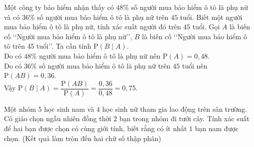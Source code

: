 \begin{ex}%
	Một công ty bảo hiểm nhận thấy có $48 \%$ số người mua bảo hiểm ô tô là phụ nữ và có $36 \%$ số người mua bảo hiểm ô tô là phụ nữ trên $45$ tuổi. Biết một người mua bảo hiểm ô tô là phụ nữ, tính xác suất người đó trên $45$ tuổi.
	\loigiai
	{
		Gọi $A$ là biến cố \lq\lq Người mua bảo hiểm ô tô là phụ nữ\rq\rq, $B$ là biến cố \lq\lq Người mua bảo hiểm ô tô trên 45 tuổi\rq\rq. Ta cần tính $\mathrm{P}(B \mid A)$.\\
		Do có $48 \%$ người mua bảo hiểm ô tô là phụ nữ nên $\mathrm{P}(A)=0{,}48$.\\
		Do có $36 \%$ số người mua bảo hiểm ô tô là phụ nữ trên $45$ tuổi nên $\mathrm{P}(A B)=0{,}36$.\\
		Vậy $\mathrm{P}(B \mid A)=\dfrac{\mathrm{P}(A B)}{\mathrm{P}(A)}=\dfrac{0{,}36}{0{,}48}=0{,}75$.  
	}
\end{ex}

\begin{ex}%
	Một nhóm $5$ học sinh nam và $4$ học sinh nữ tham gia lao động trên sân trường. Cô giáo chọn ngẫu nhiên đồng thời $2$ bạn trong nhóm đi tưới cây. Tính xác suất để hai bạn được chọn có cùng giới tính, biết rằng có ít nhất $1$ bạn nam được chọn.	(Kết quả làm tròn đến hai chữ số thập phân)
\end{ex}


